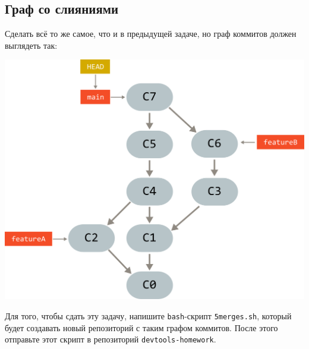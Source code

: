 \documentclass{article}
\begin{document}
\subsection{Граф со слияниями}
Сделать всё то же самое, что и в предыдущей задаче, но граф коммитов должен выглядеть так:
\begin{center}
\includegraphics[scale=0.85]{../images/graph_with_merges.png}
\end{center}

\noindent Для того, чтобы сдать эту задачу, напишите \texttt{bash}-скрипт \texttt{5merges.sh}, который будет создавать новый репозиторий с таким графом коммитов. После этого отправьте этот скрипт в репозиторий \texttt{devtools-homework}.
\end{document}
